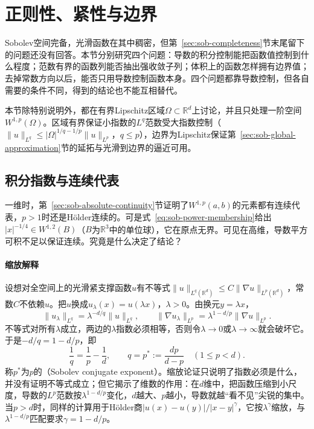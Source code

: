 
\section{正则性、紧性与边界}
\label{sec:sob-regularity}

Sobolev空间完备，光滑函数在其中稠密，但第~\ref{sec:sob-completeness}节末尾留下的问题还没有回答。本节分别研究四个问题：导数的积分控制能把函数值控制到什么程度；范数有界的函数列能否抽出强收敛子列；体积上的函数怎样拥有边界值；去掉常数方向以后，能否只用导数控制函数本身。四个问题都靠导数控制，但各自需要的条件不同，得到的结论也不能互相替代。

本节除特别说明外，都在有界Lipschitz区域$\Omega\subset\mathbb R^d$上讨论，并且只处理一阶空间$W^{1,p}(\Omega)$。区域有界保证小指数的$L^q$范数受大指数控制（$\|u\|_{L^q}\le|\Omega|^{1/q-1/p}\|u\|_{L^p}$，$q\le p$），边界为Lipschitz保证第~\ref{sec:sob-global-approximation}节的延拓与光滑到边界的逼近可用。

\subsection{积分指数与连续代表}
\label{sec:sob-embedding}

一维时，第~\ref{sec:sob-absolute-continuity}节证明了$W^{1,p}(a,b)$的元素都有连续代表，$p>1$时还是Hölder连续的。可是式~\eqref{eq:sob-power-membership}给出$|x|^{-1/4}\in W^{1,2}(B)$（$B$为$\mathbb R^3$中的单位球），它在原点无界。可见在高维，导数平方可积不足以保证连续。究竟是什么决定了结论？

\paragraph{缩放解释}
设想对全空间上的光滑紧支撑函数$u$有不等式$\|u\|_{L^q(\mathbb R^d)}\le C\|\nabla u\|_{L^p(\mathbb R^d)}$，常数$C$不依赖$u$。把$u$换成$u_\lambda(x)=u(\lambda x)$，$\lambda>0$。由换元$y=\lambda x$，
\[
 \|u_\lambda\|_{L^q}=\lambda^{-d/q}\|u\|_{L^q},\qquad\|\nabla u_\lambda\|_{L^p}=\lambda^{1-d/p}\|\nabla u\|_{L^p} .
\]
不等式对所有$\lambda$成立，两边的$\lambda$指数必须相等，否则令$\lambda\to0$或$\lambda\to\infty$就会破坏它。于是$-d/q=1-d/p$，即
\begin{equation}
 \frac1q=\frac1p-\frac1d,\qquad q=p^*:=\frac{dp}{d-p}\quad(1\le p<d).
 \label{eq:sob-sobolev-exponent}
\end{equation}
称$p^*$为$p$的（Sobolev conjugate exponent）。缩放论证只说明了指数必须是什么，并没有证明不等式成立；但它揭示了维数的作用：在$d$维中，把函数压缩到小尺度，导数的$L^p$范数按$\lambda^{1-d/p}$变化，$d$越大、$p$越小，导数就越“看不见”尖锐的集中。当$p>d$时，同样的计算用于Hölder商$|u(x)-u(y)|/|x-y|^\gamma$，它按$\lambda^\gamma$缩放，与$\lambda^{1-d/p}$匹配要求$\gamma=1-d/p$。

